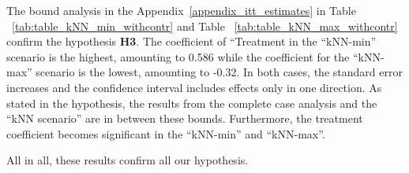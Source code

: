 The bound analysis in the Appendix~\ref{appendix_itt_estimates} in Table ~\ref{tab:table_kNN_min_withcontr} and Table ~\ref{tab:table_kNN_max_withcontr} confirm the hypothesis \textbf{H3}. The coefficient of ``Treatment in the ``kNN-min'' scenario is the highest, amounting to 0.586 while the coefficient for the ``kNN-max'' scenario is the lowest, amounting to -0.32. In both cases, the standard error increases and the confidence interval includes effects only in one direction. As stated in the hypothesis, the results from the complete case analysis and the ``kNN scenario'' are in between these bounds. Furthermore, the treatment coefficient becomes significant in the ``kNN-min'' and ``kNN-max''.

All in all, these results confirm all our hypothesis.



